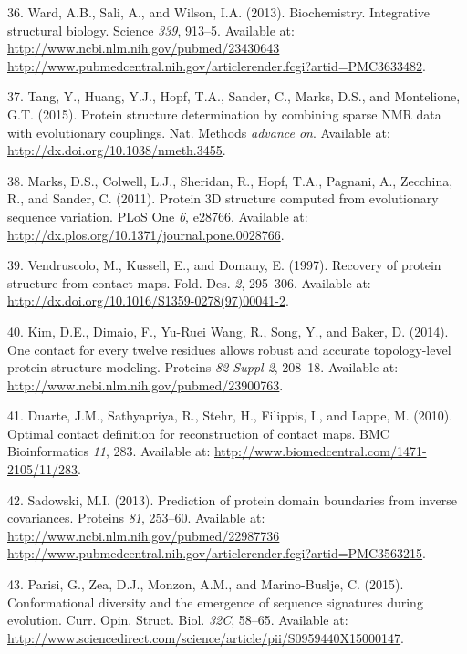 \documentclass[11pt,a4paper,twoside]{book}
\theoremstyle{definition}
\theoremstyle{definition}
\theoremstyle{remark}
\begin{document}
\hypertarget{ref-Ward2013}{}
36. Ward, A.B., Sali, A., and Wilson, I.A. (2013). Biochemistry.
Integrative structural biology. Science \emph{339}, 913--5. Available
at:
\href{http://www.ncbi.nlm.nih.gov/pubmed/23430643\%20http://www.pubmedcentral.nih.gov/articlerender.fcgi?artid=PMC3633482}{http://www.ncbi.nlm.nih.gov/pubmed/23430643 http://www.pubmedcentral.nih.gov/articlerender.fcgi?artid=PMC3633482}.

\hypertarget{ref-Tang2015}{}
37. Tang, Y., Huang, Y.J., Hopf, T.A., Sander, C., Marks, D.S., and
Montelione, G.T. (2015). Protein structure determination by combining
sparse NMR data with evolutionary couplings. Nat. Methods \emph{advance
on}. Available at: \url{http://dx.doi.org/10.1038/nmeth.3455}.

\hypertarget{ref-Marks2011}{}
38. Marks, D.S., Colwell, L.J., Sheridan, R., Hopf, T.A., Pagnani, A.,
Zecchina, R., and Sander, C. (2011). Protein 3D structure computed from
evolutionary sequence variation. PLoS One \emph{6}, e28766. Available
at: \url{http://dx.plos.org/10.1371/journal.pone.0028766}.

\hypertarget{ref-Vendruscolo1997}{}
39. Vendruscolo, M., Kussell, E., and Domany, E. (1997). Recovery of
protein structure from contact maps. Fold. Des. \emph{2}, 295--306.
Available at: \url{http://dx.doi.org/10.1016/S1359-0278(97)00041-2}.

\hypertarget{ref-Kim2014}{}
40. Kim, D.E., Dimaio, F., Yu-Ruei Wang, R., Song, Y., and Baker, D.
(2014). One contact for every twelve residues allows robust and accurate
topology-level protein structure modeling. Proteins \emph{82 Suppl 2},
208--18. Available at:
\url{http://www.ncbi.nlm.nih.gov/pubmed/23900763}.

\hypertarget{ref-Duarte2010}{}
41. Duarte, J.M., Sathyapriya, R., Stehr, H., Filippis, I., and Lappe,
M. (2010). Optimal contact definition for reconstruction of contact
maps. BMC Bioinformatics \emph{11}, 283. Available at:
\url{http://www.biomedcentral.com/1471-2105/11/283}.

\hypertarget{ref-Sadowski2013}{}
42. Sadowski, M.I. (2013). Prediction of protein domain boundaries from
inverse covariances. Proteins \emph{81}, 253--60. Available at:
\href{http://www.ncbi.nlm.nih.gov/pubmed/22987736\%20http://www.pubmedcentral.nih.gov/articlerender.fcgi?artid=PMC3563215}{http://www.ncbi.nlm.nih.gov/pubmed/22987736 http://www.pubmedcentral.nih.gov/articlerender.fcgi?artid=PMC3563215}.

\hypertarget{ref-Parisi2015a}{}
43. Parisi, G., Zea, D.J., Monzon, A.M., and Marino-Buslje, C. (2015).
Conformational diversity and the emergence of sequence signatures during
evolution. Curr. Opin. Struct. Biol. \emph{32C}, 58--65. Available at:
\url{http://www.sciencedirect.com/science/article/pii/S0959440X15000147}.
\end{document}
